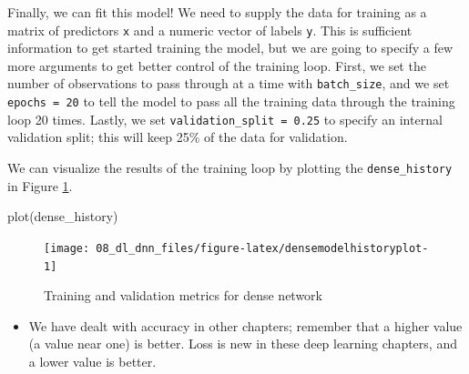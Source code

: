 \documentclass[
]{krantz}
\makeatletter
\newenvironment{Shaded}{\begin{snugshade}}{\end{snugshade}}
\newcommand{\AttributeTok}[1]{\textcolor[rgb]{0.77,0.63,0.00}{#1}}
\newcommand{\ConstantTok}[1]{\textcolor[rgb]{0.00,0.00,0.00}{#1}}
\newcommand{\DecValTok}[1]{\textcolor[rgb]{0.00,0.00,0.81}{#1}}
\newcommand{\FloatTok}[1]{\textcolor[rgb]{0.00,0.00,0.81}{#1}}
\newcommand{\FunctionTok}[1]{\textcolor[rgb]{0.00,0.00,0.00}{#1}}
\newcommand{\NormalTok}[1]{#1}
\newcommand{\OtherTok}[1]{\textcolor[rgb]{0.56,0.35,0.01}{#1}}
\newcommand{\SpecialCharTok}[1]{\textcolor[rgb]{0.00,0.00,0.00}{#1}}
\newenvironment{kframe}{%
\medskip{}
\setlength{\fboxsep}{.8em}
 \def\at@end@of@kframe{}%
 \ifinner\ifhmode%
  \def\at@end@of@kframe{\end{minipage}}%
  \begin{minipage}{\columnwidth}%
 \fi\fi%
 \def\FrameCommand##1{\hskip\@totalleftmargin \hskip-\fboxsep
 \colorbox{shadecolor}{##1}\hskip-\fboxsep
     \hskip-\linewidth \hskip-\@totalleftmargin \hskip\columnwidth}%
 \MakeFramed {\advance\hsize-\width
   \@totalleftmargin\z@ \linewidth\hsize
   \@setminipage}}%
 {\par\unskip\endMakeFramed%
 \at@end@of@kframe}
\renewenvironment{Shaded}{\begin{kframe}}{\end{kframe}}
\newenvironment{rmdblock}[1]
  {\begin{shaded*}
  \begin{itemize}[left = -1cm, labelsep = 1cm]
  \renewcommand{\labelitemi}{
    \raisebox{-.7\height}[0pt][0pt]{
      {\setkeys{Gin}{width=3em,keepaspectratio}\texttt{[image: images/\#1]}}
    }
  }
 
  \item
  }
  {
  \end{itemize}
  \end{shaded*}
  }
\newenvironment{rmdnote}
  {\begin{rmdblock}{note}}
  {\end{rmdblock}}
\makeatother
\begin{document}
Finally, we can fit this model! We need to supply the data for training as a matrix of predictors \texttt{x} and a numeric vector of labels \texttt{y}.
This is sufficient information to get started training the model, but we are going to specify a few more arguments to get better control of the training loop. First, we set the number of observations to pass through at a time with \texttt{batch\_size}, and we set \texttt{epochs\ =\ 20} to tell the model to pass all the training data through the training loop 20 times. Lastly, we set \texttt{validation\_split\ =\ 0.25} to specify an internal validation split; this will keep 25\% of the data for validation.

\begin{Shaded}
\end{Shaded}

We can visualize the results of the training loop by plotting the \texttt{dense\_history} in Figure \ref{fig:densemodelhistoryplot}.

\begin{Shaded}
\begin{Highlighting}[]
\FunctionTok{plot}\NormalTok{(dense\_history)}
\end{Highlighting}
\end{Shaded}

\begin{figure}

{\centering \texttt{[image: 08\_dl\_dnn\_files/figure-latex/densemodelhistoryplot-1]} 

}

\caption{Training and validation metrics for dense network}\label{fig:densemodelhistoryplot}
\end{figure}

\begin{rmdnote}
We have dealt with accuracy in other chapters; remember that a higher
value (a value near one) is better. Loss is new in these deep learning
chapters, and a lower value is better.
\end{rmdnote}
\end{document}
